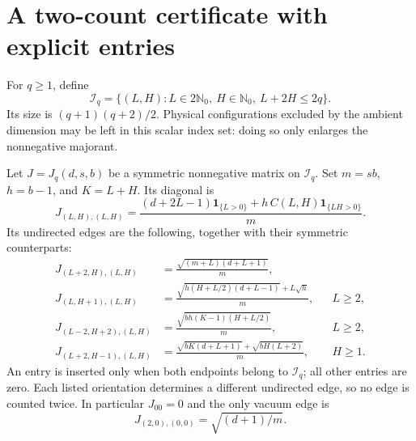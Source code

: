 \documentclass[11pt]{article}
\numberwithin{equation}{section}
\theoremstyle{definition}\newtheorem{definition}[theorem]{Definition}
\theoremstyle{remark}\newtheorem{remark}[theorem]{Remark}
\newcommand{\one}{\mathbf1}\newcommand{\F}{\mathbb F}
\begin{document}
\section{A two-count certificate with explicit entries}
\label{sec:certificate}
For $q\ge1$, define
\begin{equation}
 \mathcal I_q=\{(L,H):L\in2\mathbb N_0,\ H\in\mathbb N_0,\ L+2H\le2q\}.
 \label{eq:states}
\end{equation}
Its size is $(q+1)(q+2)/2$. Physical configurations excluded by the ambient dimension may be left in this scalar index set: doing so only enlarges the nonnegative majorant.

Let $J=J_q(d,s,b)$ be a symmetric nonnegative matrix on $\mathcal I_q$. Set $m=sb$, $h=b-1$, and $K=L+H$. Its diagonal is
\begin{equation}
 J_{(L,H),(L,H)}
 =\frac{(d+2L-1)\one_{\{L>0\}}+h\,C(L,H)\one_{\{LH>0\}}}{m}.
 \label{eq:Jdiag}
\end{equation}
Its undirected edges are the following, together with their symmetric counterparts:
\begin{align}
 J_{(L+2,H),(L,H)}
 &=\frac{\sqrt{(m+L)(d+L+1)}}{m},
 \label{eq:Jlight}\\
 J_{(L,H+1),(L,H)}
 &=\frac{\sqrt{h(H+L/2)(d+L-1)}+L\sqrt h}{m},
 && L\ge2,
 \label{eq:Jmixed}\\
 J_{(L-2,H+2),(L,H)}
 &=\frac{\sqrt{bh(K-1)(H+L/2)}}{m},
 && L\ge2,
 \label{eq:Jheavy}\\
 J_{(L+2,H-1),(L,H)}
 &=\frac{\sqrt{bK(d+L+1)}+\sqrt{bH(L+2)}}{m},
 && H\ge1.
 \label{eq:Jwithin}
\end{align}
An entry is inserted only when both endpoints belong to $\mathcal I_q$; all other entries are zero. Each listed orientation determines a different undirected edge, so no edge is counted twice. In particular $J_{00}=0$ and the only vacuum edge is
\[
 J_{(2,0),(0,0)}=\sqrt{(d+1)/m}.
\]
\end{document}
